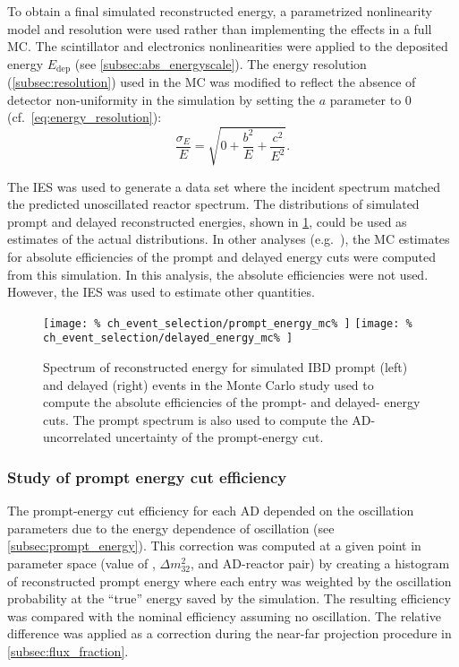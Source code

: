 To obtain a final simulated reconstructed energy,
a parametrized nonlinearity model and resolution were used
rather than implementing the effects in a full MC.
The scintillator and electronics nonlinearities were applied
to the deposited energy $E_{\text{dep}}$
(see \cref{subsec:abs_energyscale}).
The energy resolution (\cref{subsec:resolution}) used in the MC
was modified to reflect
the absence of detector non-uniformity in the simulation
by setting the $a$ parameter to 0 (cf.\ \cref{eq:energy_resolution}):
\begin{equation}
    \frac{\sigma_E}{E} = \sqrt{0 + \frac{b^2}{E} + \frac{c^2}{E^2}}.
\end{equation}

The IES was used to generate a data set
where the incident \nuebar{} spectrum
matched the predicted unoscillated reactor \nuebar{} spectrum.
The distributions of simulated prompt and delayed reconstructed energies,
shown in \cref{fig:prompt_eff_mc},
could be used as estimates of the actual distributions.
In other analyses (e.g.\ \cite{nh2016}), the MC estimates
for absolute efficiencies of the prompt and delayed energy cuts
were computed from this simulation.
In this analysis, the absolute efficiencies were not used.
However, the IES was used to estimate other quantities.

\begin{figure}
    \centering
    \texttt{[image: \%
        ch\_event\_selection/prompt\_energy\_mc\%
    ]}
    \texttt{[image: \%
        ch\_event\_selection/delayed\_energy\_mc\%
    ]}
    \caption[Simulated prompt and delayed spectra]{Spectrum of reconstructed energy for simulated IBD prompt (left)
        and delayed (right) events
        in the Monte Carlo study used to compute the absolute efficiencies
        of the prompt- and delayed- energy cuts.
        The prompt spectrum is also used to compute the
        AD-uncorrelated uncertainty of the prompt-energy cut.
    }
    \label{fig:prompt_eff_mc}
\end{figure}

\subsubsection{Study of prompt energy cut efficiency}

The prompt-energy cut efficiency for each AD depended on
the oscillation parameters due to the energy dependence of \nuebar{} oscillation
(see \cref{subsec:prompt_energy}).
This correction was computed at a given point in parameter space
(value of \thetaot{}, $\Delta m^2_{32}$, and AD-reactor pair)
by creating a histogram of reconstructed prompt energy
where each entry was weighted by the oscillation probability
at the ``true'' \nuebar{} energy saved by the simulation.
The resulting efficiency was compared
with the nominal efficiency assuming no oscillation.
The relative difference was applied as a correction
during the near-far projection procedure in \cref{subsec:flux_fraction}.

